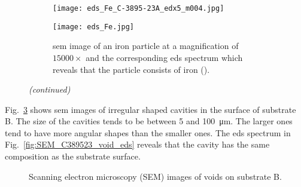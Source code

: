 %
\begin{figure}[htbp]
\ContinuedFloat
    \centering
    \begin{subfigure}[t]{\textwidth}
          \begin{minipage}[t]{0.49\linewidth}
            \centering
            \texttt{[image: eds\_Fe\_C-3895-23A\_edx5\_m004.jpg]}
          \end{minipage}
          \hspace{0.02\linewidth}
          \begin{minipage}[t]{0.49\linewidth}
            \centering
            \texttt{[image: eds\_Fe.jpg]}
          \end{minipage}
    \caption{\Ac{sem} image of an iron particle at a magnification of $15000\times$ and the corresponding \ac{eds} spectrum which reveals that the particle consists of iron ().}\label{fig:subBa_partice_Fe}
    \end{subfigure}%
    \captionsetup{list=no}
    \caption{\emph{(continued)}}
\end{figure}

Fig.~\ref{fig:SEM_C389523_voids} shows \ac{sem} images of irregular shaped cavities in the surface of substrate B. The size of the cavities tends to be between \SI{5}{} and \SI{100}{\micro\metre}. The larger ones tend to have more angular shapes than the smaller ones. The \ac{eds} spectrum in Fig.~\ref{fig:SEM_C389523_void_eds} reveals that the cavity has the same composition as the substrate surface.

\begin{figure}[htbp]
    \centering
    \caption[SEM images of voids on substrate B.]{Scanning electron microscopy (SEM) images of voids on substrate B.}
    \label{fig:SEM_C389523_voids}
\end{figure}

